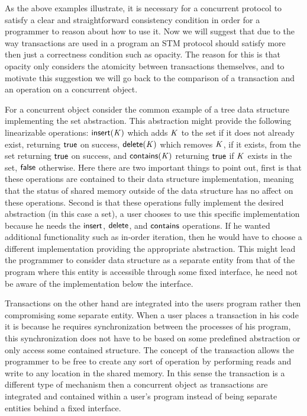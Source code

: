As the above examples illustrate, it is necessary for a concurrent protocol
to satisfy a clear and straightforward consistency condition in order
for a programmer to reason about how to use it.
Now we will suggest that due to the way transactions are used in a program
an STM protocol should satisfy more then just a correctness condition
such as opacity.
The reason for this is that opacity only considers the atomicity between transactions themselves,
and to motivate this suggestion we will go back to the comparison of
a transaction and an operation on a concurrent object.

For a concurrent object consider the common example of a tree
data structure implementing the set abstraction.
This abstraction might provide the following linearizable operations:
$\act{insert}(\ms{K})$ which adds $\ms{K}$ to the set if it does not already exist, returning $\lit{true}$
on success, $\act{delete}(\ms{K})$ which removes $\ms{K}$, if it exists, from the set
returning $\lit{true}$ on success, and $\act{contains}(\ms{K})$ returning $\lit{true}$ if $\ms{K}$
exists in the set, $\lit{false}$ otherwise.
Here there are two important things to point out, first is that these operations
are contained to their data structure implementation, meaning that the status of shared
memory outside of the data structure has no affect on these operations.
Second is that these operations fully implement the desired abstraction
(in this case a set),
a user chooses to use this specific implementation because he needs
the $\act{insert}$, $\act{delete}$, and $\act{contains}$ operations.
If he wanted additional functionality such as in-order iteration, then
he would have to choose a different implementation providing the appropriate
abstraction.
This might lead the programmer to consider data structure as a separate entity
from that of the program where this entity is accessible through some fixed
interface, he need not be aware of the implementation below the interface.

Transactions on the other hand are integrated into the users program
rather then compromising some separate entity.
When a user places a transaction in his code it is because he requires
synchronization between the processes of his program, this synchronization
does not have to be based on some predefined abstraction or only access
some contained structure.
The concept of the transaction allows the programmer to be free to
create any sort of operation by performing reads and write to any
location in the shared memory.
In this sense the transaction is a different type of mechanism
then a concurrent object as transactions are integrated and contained within
a user's program instead of being separate entities behind
a fixed interface.

